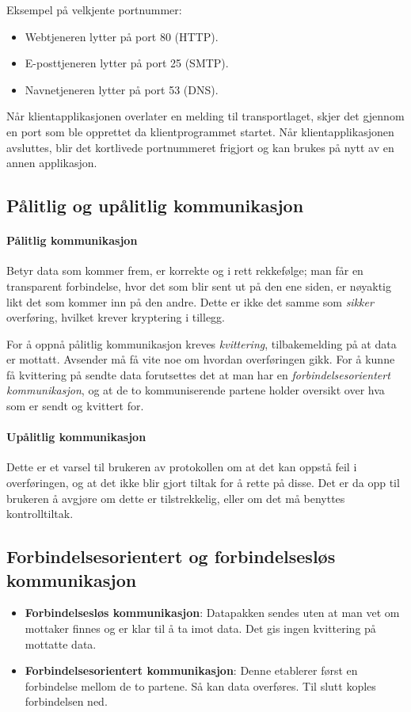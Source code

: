 \documentclass[11pt,a4paper]{article}
\begin{document}
Eksempel på velkjente portnummer:

\begin{itemize}
\item{Webtjeneren lytter på port 80 (HTTP).}
\item{E-posttjeneren lytter på port 25 (SMTP).}
\item{Navnetjeneren lytter på port 53 (DNS).}
\end{itemize}

Når klientapplikasjonen overlater en melding til transportlaget, skjer det gjennom en port som ble opprettet da klientprogrammet startet. Når klientapplikasjonen avsluttes, blir det kortlivede portnummeret frigjort og kan brukes på nytt av en annen applikasjon.

\subsection{Pålitlig og upålitlig kommunikasjon}

\paragraph{Pålitlig kommunikasjon} 
Betyr data som kommer frem, er korrekte og i rett rekkefølge; man får en transparent forbindelse, hvor det som blir sent ut på den ene siden, er nøyaktig likt det som kommer inn på den andre. Dette er ikke det samme som \textit{sikker} overføring, hvilket krever kryptering i tillegg.

For å oppnå pålitlig kommunikasjon kreves \textit{kvittering}, tilbakemelding på at data er mottatt. Avsender må få vite noe om hvordan overføringen gikk. For å kunne få kvittering på sendte data forutsettes det at man har en \textit{forbindelsesorientert kommunikasjon}, og at de to kommuniserende partene holder oversikt over hva som er sendt og kvittert for.

\paragraph{Upålitlig kommunikasjon}
Dette er et varsel til brukeren av protokollen om at det kan oppstå feil i overføringen, og at det ikke blir gjort tiltak for å rette på disse. Det er da opp til brukeren å avgjøre om dette er tilstrekkelig, eller om det må benyttes kontrolltiltak.

\subsection{Forbindelsesorientert og forbindelsesløs kommunikasjon}
\begin{itemize}
\item{\textbf{Forbindelsesløs kommunikasjon}: Datapakken sendes uten at man vet om mottaker finnes og er klar til å ta imot data. Det gis ingen kvittering på mottatte data.}
\item{\textbf{Forbindelsesorientert kommunikasjon}: Denne etablerer først en forbindelse mellom de to partene. Så kan data overføres. Til slutt koples forbindelsen ned.}
\end{itemize}
\end{document}
